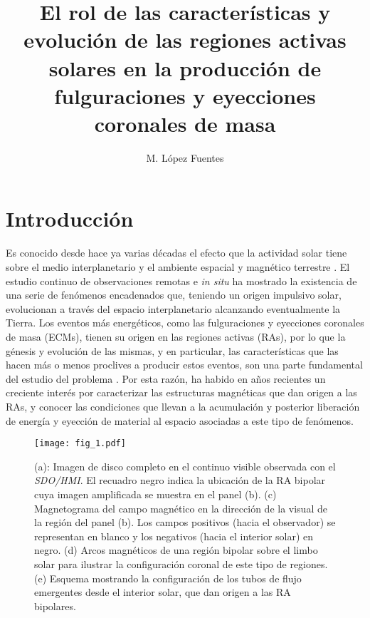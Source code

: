 \documentclass[baaa]{baaa}
\title{El rol de las características y evolución de las regiones
activas solares en la producción de fulguraciones y
eyecciones coronales de masa}
\author{
M. López Fuentes\inst{1}
}
\institute{
Instituto de Astronomía y Física del Espacio, CONICET--UBA, Argentina
}
\begin{document}
\maketitle

\section{Introducción}
\label{S_intro}

Es conocido desde hace ya varias décadas el efecto que la actividad solar tiene sobre el medio interplanetario y el ambiente espacial y magnético terrestre \citep{temmer2021}. El estudio continuo de observaciones remotas e \textit{in situ} ha mostrado la existencia de una serie de fenómenos encadenados que, teniendo un origen impulsivo solar, evolucionan a través del espacio interplanetario alcanzando eventualmente la Tierra. Los eventos más energéticos, como las fulguraciones y eyecciones coronales de masa (ECMs), tienen su origen en las regiones activas (RAs), por lo que la génesis y evolución de las mismas, y en particular, las características que las hacen más o menos proclives a producir estos eventos, son una parte fundamental del estudio del problema \citep{toriumi2019}. Por esta razón, ha habido en años recientes un creciente interés por caracterizar las estructuras magnéticas que dan origen a las RAs, y conocer las condiciones que llevan a la acumulación y posterior liberación de energía y eyección de material al espacio asociadas a este tipo de fenómenos.

\begin{figure*}[!t]
\centering
\texttt{[image: fig\_1.pdf]}
\caption{(a): Imagen de disco completo en el continuo visible observada con el {\sl SDO/HMI}. El recuadro negro indica la ubicación de la RA bipolar cuya imagen amplificada se muestra en el panel (b). (c) Magnetograma del campo magnético en la dirección de la visual de la región del panel (b). Los campos positivos (hacia el observador) se representan en blanco y los negativos (hacia el interior solar) en negro. (d) Arcos magnéticos de una región bipolar sobre el limbo solar para ilustrar la configuración coronal de este tipo de regiones. (e) Esquema mostrando la configuración de los tubos de flujo emergentes desde el interior solar, que dan origen a las RA bipolares.}  
\label{fig_1}
\end{figure*}
\end{document}
